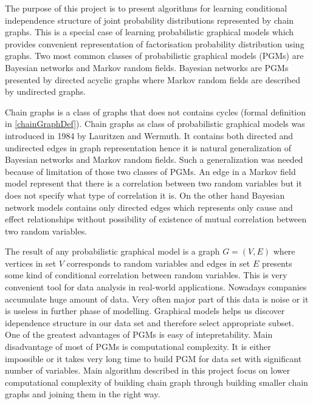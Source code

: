 

The purpose of this project is to present algorithms for learning conditional independence structure of joint probability distributions represented by chain graphs. 
This is a special case of learning probabilistic graphical models which provides convenient representation of factorisation probability distribution using graphs.
Two most common classes of probabilistic graphical models (PGMs) are Bayesian networks and Markov random fields. 
Bayesian networks are PGMs presented by directed acyclic graphs where Markov random fields are described by undirected graphs.

Chain graphs is a class of graphs that does not contains cycles (formal definition in \ref{chainGraphDef}). 
Chain graphs as class of probabilistic graphical models was introduced in 1984 by Lauritzen and Wermuth. 
It contains both directed and undirected edges in graph representation hence it is natural generalization of Bayesian networks and Markov random fields.
Such a generalization was needed because of limitation of those two classes of PGMs. An edge in a Markov field model represent that there is a correlation 
between two random variables but it does not specify what type of correlation it is. On the other hand Bayesian network models contains only directed edges which represents 
only cause and effect relationships without possibility of existence of mutual correlation between two random variables.

The result of any probabilistic graphical model is a graph $G = (V, E)$ where vertices in set $V$ corresponds to random variables and edges in set $E$ presents
some kind of conditional correlation between random variables. This is very convenient tool for data analysis in real-world applications. 
Nowadays companies accumulate huge amount of data.
Very often major part of this data is noise or it is useless in further phase of modelling. 
Graphical models helps us discover idependence structure in our data set and therefore
select appropriate subset. One of the greatest advantages of PGMs is easy of intepretability. 
Main disadvantage of most of PGMs is computational complexity. It is either impossible or
it takes very long time to build PGM for data set with significant number of variables.
Main algorithm described in this project focus on lower computational complexity of building chain 
graph through building smaller chain graphs and joining them in the right way.


